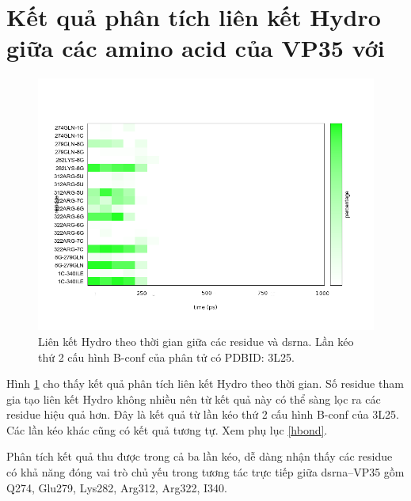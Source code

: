 \documentclass[12pt,a4paper,reqno, oneside]{book}
\begin{document}
\section{Kết quả phân tích liên kết Hydro giữa các amino acid của VP35 với }
\label{hbond-result}
\begin{figure}[h!]
\includegraphics[width=\textwidth,natwidth=610,natheight=642]{hbond3L25_pull2}
\caption{Liên kết Hydro theo thời gian giữa các \gls{residue} và \gls{dsrna}. Lần kéo thứ 2 cấu hình B-conf của phân tử có PDBID: 3L25.}
\label{fig:hbond3L25_pull2}
\end{figure}

Hình \ref{fig:hbond3L25_pull2} cho thấy kết quả phân tích liên kết Hydro theo thời gian. Số \gls{residue} tham gia tạo liên kết Hydro không nhiều nên từ kết quả này có thể sàng lọc ra các \gls{residue} hiệu quả hơn. Đây là kết quả từ lần kéo thứ 2 cấu hình B-conf của 3L25. Các lần kéo khác cũng có kết quả tương tự. Xem phụ lục \ref{hbond}.

Phân tích kết quả thu được trong cả ba lần kéo, dễ dàng nhận thấy các \gls{residue} có khả năng đóng vai trò chủ yếu trong tương tác trực tiếp giữa \gls{dsrna}--VP35 gồm Q274, Glu279, Lys282, Arg312, Arg322, I340.
\end{document}
